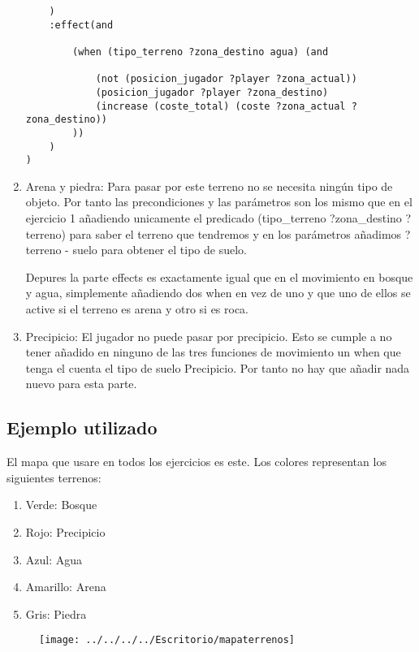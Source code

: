 \documentclass[]{article}
\begin{document}
\begin{enumerate}
\begin{lstlisting}
	)
	:effect(and 
		
		(when (tipo_terreno ?zona_destino agua) (and 
		
			(not (posicion_jugador ?player ?zona_actual))
			(posicion_jugador ?player ?zona_destino)
			(increase (coste_total) (coste ?zona_actual ?zona_destino))
		))
	)
)

\end{lstlisting}

\item{Arena y piedra:} Para pasar por este terreno no se necesita ningún tipo de objeto. Por tanto las precondiciones y las parámetros son los mismo que en el ejercicio 1 añadiendo unicamente el predicado (tipo\_terreno ?zona\_destino ?terreno) para saber el terreno que tendremos y en los parámetros añadimos ?terreno - suelo para obtener el tipo de suelo. 

Depures la parte effects es exactamente igual que en el movimiento en bosque y agua, simplemente añadiendo dos when en vez de uno y que uno de ellos se active si el terreno es arena y otro si es roca. 

\item{Precipicio:} El jugador no puede pasar por precipicio. Esto se cumple a no tener añadido en ninguno de las tres funciones de movimiento un when que tenga el cuenta el tipo de suelo Precipicio. Por tanto no hay que añadir nada nuevo para esta parte.

\end{enumerate}
\newpage
\subsection{Ejemplo utilizado}
El mapa que usare en todos los ejercicios es este. Los colores representan los siguientes terrenos:
\begin{enumerate}
	\item{Verde:} Bosque
	\item{Rojo:} Precipicio
	\item{Azul:} Agua
	\item{Amarillo:} Arena
	\item{Gris:} Piedra
\end{enumerate}

\begin{figure}[H]
	\centering
	\texttt{[image: ../../../../Escritorio/mapaterrenos]}
	\caption{}
	\label{fig:mapaterrenos}
\end{figure}
\end{document}
